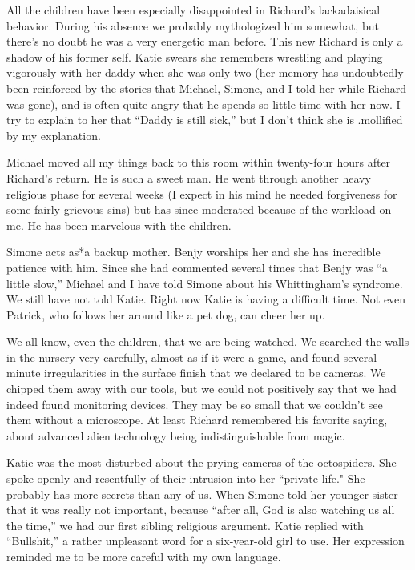 \documentclass[]{article}
\begin{document}
{All the children have been especially disappointed in Richard’s lackadaisical behavior.  During his absence we probably mythologized him somewhat, but there’s no doubt he was a very energetic man before.  This new Richard is only a shadow of his former self.  Katie swears she remembers wrestling and playing vigorously with her daddy when she was only two (her memory has undoubtedly been reinforced by the stories that Michael, Simone, and I told her while Richard was gone), and is often quite angry that he spends so little time with her now.  I try to explain to her that “Daddy is still sick,” but I don’t think she is .mollified by my explanation.

Michael moved all my things back to this room within twenty-four hours after Richard’s return.  He is such a sweet man.  He went through another heavy religious phase for several weeks (I expect in his mind he needed forgiveness for some fairly grievous sins) but has since moderated because of the workload on me.  He has been marvelous with the children.

Simone acts as*a backup mother.  Benjy worships her and she has incredible patience with him.  Since she had commented several times that Benjy was “a little slow,” Michael and I have told Simone about his Whittingham’s syndrome.  We still have not told Katie.  Right now Katie is having a difficult time.  Not even Patrick, who follows her around like a pet dog, can cheer her up.

We all know, even the children, that we are being watched.  We searched the walls in the nursery very carefully, almost as if it were a game, and found several minute irregularities in the surface finish that we declared to be cameras.  We chipped them away with our tools, but we could not positively say that we had indeed found monitoring devices.  They may be so small that we couldn’t see them without a microscope.  At least Richard remembered his favorite saying, about advanced alien technology being indistinguishable from magic.

Katie was the most disturbed about the prying cameras of the octospiders.  She spoke openly and resentfully of their intrusion into her “private life."  She probably has more secrets than any of us.  When Simone told her younger sister that it was really not important, because “after all, God is also watching us all the time,” we had our first sibling religious argument.  Katie replied with “Bullshit,” a rather unpleasant word for a six-year-old girl to use.  Her expression reminded me to be more careful with my own language.

}
\end{document}
